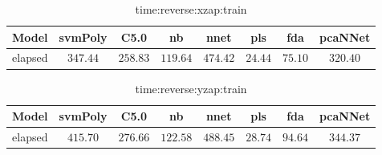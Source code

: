 \begin{table}[!ht]
	\centering
	\begin{tabular}{|c|c|c|c|c|c|c|c|}
		\hline
		Model & svmPoly & C5.0 & nb & nnet & pls & fda & pcaNNet \\ \hline
		elapsed & $347.44$ & $258.83$ & $119.64$ & $474.42$ & $24.44$ & $75.10$ & $320.40$ \\ \hline
	\end{tabular}
	\caption{time:reverse:xzap:train}
	\label{tab:time:reverse:xzap:train}
\end{table}

\begin{table}[!ht]
	\centering
	\begin{tabular}{|c|c|c|c|c|c|c|c|}
		\hline
		Model & svmPoly & C5.0 & nb & nnet & pls & fda & pcaNNet \\ \hline
		elapsed & $415.70$ & $276.66$ & $122.58$ & $488.45$ & $28.74$ & $94.64$ & $344.37$ \\ \hline
	\end{tabular}
	\caption{time:reverse:yzap:train}
	\label{tab:time:reverse:yzap:train}
\end{table}

